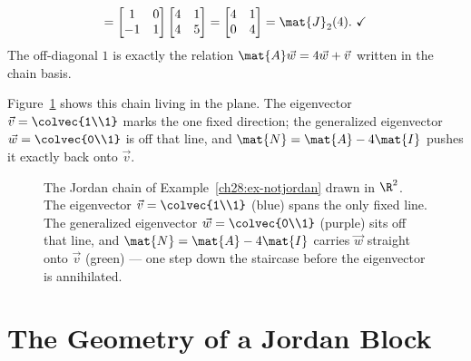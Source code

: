 \begin{example}
\[=\begin{bmatrix}1&0\\-1&1\end{bmatrix}\begin{bmatrix}4&1\\4&5\end{bmatrix}
=\begin{bmatrix}4&1\\0&4\end{bmatrix}=\mat{J}_2(4).\ \checkmark
\]
The off-diagonal $1$ is exactly the relation $\mat{A}\vec{w}=4\vec{w}+\vec{v}$ written in
the chain basis.
\end{example}

Figure~\ref{ch28:concrete-chain} shows this chain living in the plane. The eigenvector
$\vec{v}=\colvec{1\\1}$ marks the one fixed direction; the generalized eigenvector
$\vec{w}=\colvec{0\\1}$ is off that line, and $\mat{N}=\mat{A}-4\mat{I}$ pushes it exactly
back onto $\vec{v}$.

\begin{figure}[H]
\centering
{}
\caption{The Jordan chain of Example~\ref{ch28:ex-notjordan} drawn in $\R^2$. The
eigenvector $\vec{v}=\protect\colvec{1\\1}$ (blue) spans the only fixed line. The
generalized eigenvector $\vec{w}=\protect\colvec{0\\1}$ (purple) sits off that line, and
$\mat{N}=\mat{A}-4\mat{I}$ carries $\vec{w}$ straight onto $\vec{v}$ (green) --- one step
down the staircase before the eigenvector is annihilated.}
\label{ch28:concrete-chain}
\end{figure}

\section{The Geometry of a Jordan Block}
\label{ch28:geometry}

